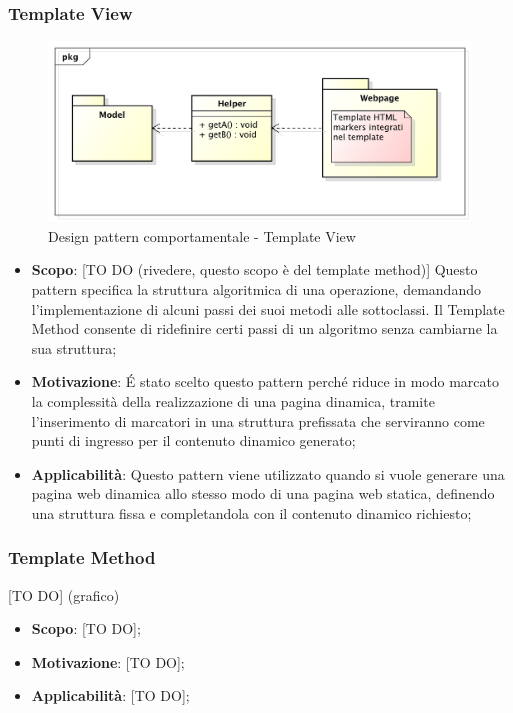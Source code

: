 		\newpage
		\subsubsection{Template View} %
		\begin{figure}[htbp]
			\centering
			\centerline{\includegraphics[scale=0.5]{./images/designpatternappendice/template_view.pdf}}
			\caption{Design pattern comportamentale - Template View}
		\end{figure}

		\begin{itemize}
			\item \textbf{Scopo}: [TO DO (rivedere, questo scopo è del template method)] Questo pattern specifica la struttura algoritmica di una operazione, demandando l'implementazione di alcuni passi dei suoi metodi alle sottoclassi. Il Template Method consente di ridefinire certi passi di un algoritmo senza cambiarne la sua struttura;
			\item \textbf{Motivazione}: \'E stato scelto questo pattern perché riduce in modo marcato la complessità della realizzazione di una pagina dinamica, tramite l'inserimento di marcatori in una struttura prefissata che serviranno come punti di ingresso per il contenuto dinamico generato;
			\item \textbf{Applicabilità}: Questo pattern viene utilizzato quando si vuole generare una pagina web dinamica allo stesso modo di una pagina web statica, definendo una struttura fissa e completandola con il contenuto dinamico richiesto;
		\end{itemize}

		\newpage
		\subsubsection{Template Method} %
		\label{ssub:template_method}
		[TO DO] (grafico)
		\begin{itemize}
			\item \textbf{Scopo}: [TO DO];
			\item \textbf{Motivazione}: [TO DO];
			\item \textbf{Applicabilità}: [TO DO];
		\end{itemize}

